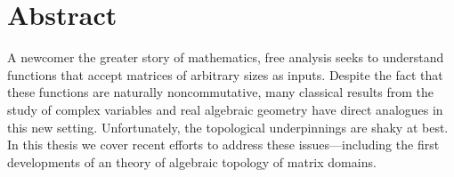 \begingroup
\let\clearpage\relax
\let\cleardoublepage\relax
\let\cleardoublepage\relax

\chapter*{Abstract}
A newcomer the greater story of mathematics, free analysis seeks to understand
functions that accept matrices of arbitrary sizes as inputs. Despite the fact
that these functions are naturally noncommutative, many classical results from
the study of complex variables and real algebraic geometry have direct analogues
in this new setting. Unfortunately, the topological underpinnings are shaky at
best. In this thesis we cover recent efforts to address these issues---including
the first developments of an theory of algebraic topology of matrix domains.



\vfill
\endgroup

\vfill
